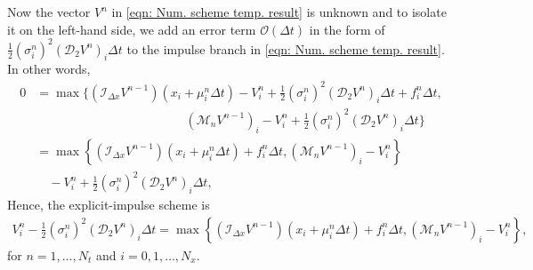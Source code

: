 Now the vector $V^n$ in \eqref{eqn: Num. scheme temp. result} is unknown and to isolate it on the left-hand side, we add an error term $\mathcal{O}(\Delta t)$ in the form of $\frac{1}{2}(\sigma_i^n)^2 (\mathcal{D}_2 V^n)_i \Delta t$ to the impulse branch in \eqref{eqn: Num. scheme temp. result}. In other words,
\begin{align*}
    0 &= \max \bigg\{ (\mathcal{I}_{\Delta x} V^{n-1})(x_i+\mu_i^n \Delta t) - V_i^n + \frac{1}{2} (\sigma_i^n)^2 (\mathcal{D}_2 V^n)_i \Delta t + f_i^n \Delta t, \\
    & \qquad \qquad \qquad \qquad \qquad \qquad (\mathcal{M}_n V^{n-1})_i - V_i^n + \frac{1}{2} (\sigma_i^n)^2 (\mathcal{D}_2 V^n)_i \Delta t \bigg\} \\ 
    &= \max \left\{ (\mathcal{I}_{\Delta x} V^{n-1})(x_i+\mu_i^n \Delta t) + f_i^n \Delta t, (\mathcal{M}_n V^{n-1})_i - V_i^n \right\}\\ 
    & \quad - V_i^n + \frac{1}{2} (\sigma_i^n)^2 (\mathcal{D}_2 V^n)_i \Delta t,
\end{align*}
Hence, the explicit-impulse scheme is
\begin{align}
    V_i^n - \frac{1}{2} (\sigma_i^n)^2 (\mathcal{D}_2 V^n)_i \Delta t = \max \left\{ (\mathcal{I}_{\Delta x} V^{n-1})(x_i+\mu_i^n \Delta t) + f_i^n \Delta t, (\mathcal{M}_n V^{n-1})_i - V_i^n \right\},
    \label{eqn: (2.20) in Azimzadeh}
\end{align}
for $n=1, \ldots, N_t$ and $i=0,1,\ldots, N_x$. 

